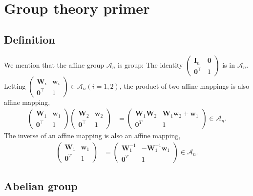 \section{\label{sec:group_primer}Group theory primer}

\subsection{Definition}

We mention that the affine group $\mathcal{A}_{n}$ is group:
The identity $ \begin{pmatrix} \bm{I}_{n} & \bm{0} \\ \bm{0}^{\top} & 1 \end{pmatrix}$ is in $\mathcal{A}_{n}$.
Letting $\begin{pmatrix} \bm{W}_{i} & \bm{w}_{i} \\ \bm{0}^{\top} & 1 \end{pmatrix} \in \mathcal{A}_{n} (i=1,2)$, the product of two affine mappings is also affine mapping,
\begin{align}
  \begin{pmatrix} \bm{W}_{1} & \bm{w}_{1} \\ \bm{0}^{\top} & 1 \end{pmatrix} \begin{pmatrix} \bm{W}_{2} & \bm{w}_{2} \\ \bm{0}^{\top} & 1 \end{pmatrix}
    &=
    \begin{pmatrix}
      \bm{W}_{1} \bm{W}_{2} & \bm{W}_{1} \bm{w}_{2} + \bm{w}_{1} \\
      \bm{0}^{T} & 1
    \end{pmatrix}
    \in \mathcal{A}_{n}.
\end{align}
The inverse of an affine mapping is also an affine mapping,
\begin{align}
  \begin{pmatrix} \bm{W}_{1} & \bm{w}_{1} \\ \bm{0}^{T} & 1 \end{pmatrix}
  &=
  \begin{pmatrix} \bm{W}_{1}^{-1} & -\bm{W}_{1}^{-1}\bm{w}_{1} \\ \bm{0}^{T} & 1 \end{pmatrix} \in \mathcal{A}_{n}.
\end{align}

\subsection{Abelian group}

